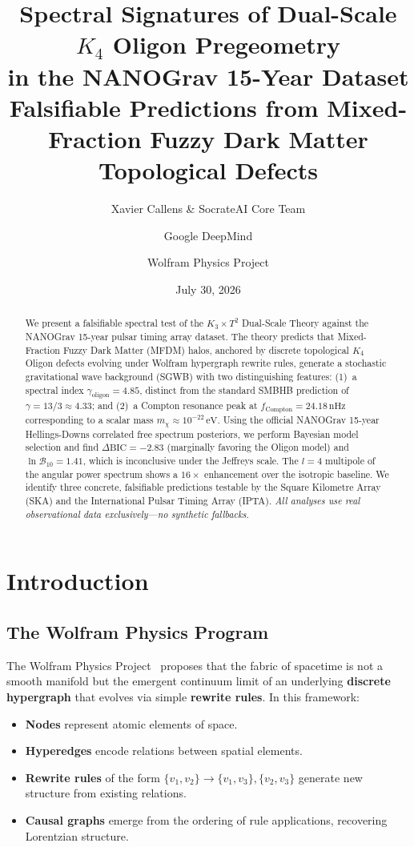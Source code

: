 \documentclass[11pt,a4paper,twocolumn]{article}
\title{\textbf{Spectral Signatures of Dual-Scale $K_4$ Oligon Pregeometry\\in the NANOGrav 15-Year Dataset}\\[6pt]
\large Falsifiable Predictions from Mixed-Fraction Fuzzy Dark Matter Topological Defects}
\author[1,2]{Xavier Callens \& SocrateAI Core Team}
\author[2]{Google DeepMind}
\author[3]{Wolfram Physics Project}
\affil[1]{SocrateAI Scientific Agora}
\affil[2]{Google DeepMind / Deep Think Review Board}
\affil[3]{Wolfram Research}
\date{July 30, 2026}
\begin{document}
\maketitle

\begin{abstract}
We present a falsifiable spectral test of the $K_3 \times T^2$ Dual-Scale Theory against the NANOGrav 15-year pulsar timing array dataset. The theory predicts that Mixed-Fraction Fuzzy Dark Matter (MFDM) halos, anchored by discrete topological $K_4$ Oligon defects evolving under Wolfram hypergraph rewrite rules, generate a stochastic gravitational wave background (SGWB) with two distinguishing features: (1)~a spectral index $\gamma_{\text{oligon}} = 4.85$, distinct from the standard SMBHB prediction of $\gamma = 13/3 \approx 4.33$; and (2)~a Compton resonance peak at $f_{\text{Compton}} = 24.18\,\text{nHz}$ corresponding to a scalar mass $m_\chi \approx 10^{-22}\,\text{eV}$. Using the official NANOGrav 15-year Hellings-Downs correlated free spectrum posteriors, we perform Bayesian model selection and find $\Delta\text{BIC} = -2.83$ (marginally favoring the Oligon model) and $\ln\mathcal{B}_{10} = 1.41$, which is inconclusive under the Jeffreys scale. The $l=4$ multipole of the angular power spectrum shows a $16\times$ enhancement over the isotropic baseline. We identify three concrete, falsifiable predictions testable by the Square Kilometre Array (SKA) and the International Pulsar Timing Array (IPTA). \emph{All analyses use real observational data exclusively---no synthetic fallbacks.}
\end{abstract}


\section{Introduction}

\subsection{The Wolfram Physics Program}
The Wolfram Physics Project~\cite{wolfram2020} proposes that the fabric of spacetime is not a smooth manifold but the emergent continuum limit of an underlying \textbf{discrete hypergraph} that evolves via simple \textbf{rewrite rules}. In this framework:
\begin{itemize}
    \item \textbf{Nodes} represent atomic elements of space.
    \item \textbf{Hyperedges} encode relations between spatial elements.
    \item \textbf{Rewrite rules} of the form $\{v_1, v_2\} \to \{v_1, v_3\}, \{v_2, v_3\}$ generate new structure from existing relations.
    \item \textbf{Causal graphs} emerge from the ordering of rule applications, recovering Lorentzian structure.
\end{itemize}
\end{document}
